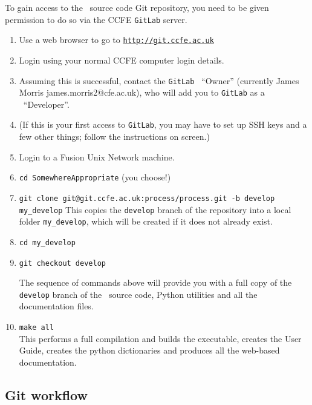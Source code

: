 To gain access to the \process\ source code Git repository, you need
to be given permission to do so via the CCFE \texttt{GitLab} server.
\begin{enumerate}

\item Use a web browser to go to
  \href{http://git.ccfe.ac.uk}{\texttt{http://git.ccfe.ac.uk}}

\item Login using your normal CCFE computer login details.

\item Assuming this is successful, contact the \texttt{GitLab} \process\
  ``Owner'' (currently James Morris james.morris2@cfe.ac.uk), who will add you to \texttt{GitLab} as a \process\ ``Developer''.

\item (If this is your first access to \texttt{GitLab}, you may have to set up
  SSH keys and a few other things; follow the instructions on screen.)

\item Login to a Fusion Unix Network machine.

\item \texttt{cd SomewhereAppropriate} (you choose!)

\item 
\texttt{git clone git@git.ccfe.ac.uk:process/process.git -b develop my\_develop}
This copies the \texttt{develop} branch of the repository into a local folder \texttt{my\_develop}, which will be created if it does not already exist.
\item \texttt{cd my\_develop}

\item \texttt{git checkout develop}

The sequence of commands above will provide you with a full copy of the \texttt{develop} branch of the \process\ source code, Python utilities and all
the documentation files. 

\item \texttt{make all}\\
This performs a full compilation and builds the executable, creates the User Guide, creates the python dictionaries and produces all the web-based documentation.

\end{enumerate}


\subsection{Git workflow}

